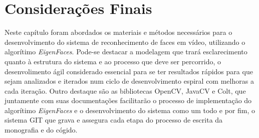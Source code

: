 \section{Considerações Finais}\label{sec:consfin}
Neste capítulo foram abordados os materiais e métodos necessários para o desenvolvimento do sistema de reconhecimento de faces em vídeo, utilizando o algorítimo \textit{EigenFaces}. Pode-se destacar a modelagem que trará esclarecimento quanto à estrutura do sistema e ao processo que deve ser percorrido, o desenvolimento ágil considerado essencial para se ter resultados rápidos para que sejam analizados e iterados num ciclo de desenvolvimento espiral com melhoras a cada iteração. Outro destaque são as bibliotecas OpenCV, JavaCV e Colt, que juntamente com suas documentações facilitarão o processo de implementação do algorítimo \textit{EigenFaces} e o desenvolvimento do sistema como um todo e por fim, o sistema GIT que grava e assegura cada etapa do processo de escrita da monografia e do cógido.







%





